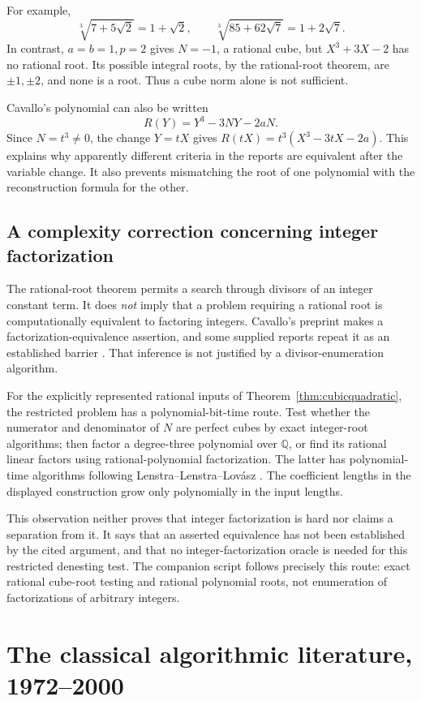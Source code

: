 \documentclass[11pt,letterpaper]{article}
\numberwithin{equation}{section}
\theoremstyle{definition}
\theoremstyle{remark}
\newcommand{\Q}{\mathbb{Q}}
\begin{document}
For example,
\[
\sqrt[3]{7+5\sqrt2}=1+\sqrt2,
\qquad
\sqrt[3]{85+62\sqrt7}=1+2\sqrt7.
\]
In contrast, $a=b=1,p=2$ gives $N=-1$, a rational cube, but $X^3+3X-2$ has no rational root. Its possible integral roots, by the rational-root theorem, are $\pm1,\pm2$, and none is a root. Thus a cube norm alone is not sufficient.

Cavallo's polynomial can also be written
\[
R(Y)=Y^3-3NY-2aN.
\]
Since $N=t^3\ne0$, the change $Y=tX$ gives $R(tX)=t^3(X^3-3tX-2a)$. This explains why apparently different criteria in the reports are equivalent after the variable change. It also prevents mismatching the root of one polynomial with the reconstruction formula for the other.

\subsection{A complexity correction concerning integer factorization}
The rational-root theorem permits a search through divisors of an integer constant term. It does \emph{not} imply that a problem requiring a rational root is computationally equivalent to factoring integers. Cavallo's preprint makes a factorization-equivalence assertion, and some supplied reports repeat it as an established barrier \cite{cavallo}. That inference is not justified by a divisor-enumeration algorithm.

For the explicitly represented rational inputs of Theorem~\ref{thm:cubicquadratic}, the restricted problem has a polynomial-bit-time route. Test whether the numerator and denominator of $N$ are perfect cubes by exact integer-root algorithms; then factor a degree-three polynomial over $\Q$, or find its rational linear factors using rational-polynomial factorization. The latter has polynomial-time algorithms following Lenstra--Lenstra--Lov\'asz \cite{lll}. The coefficient lengths in the displayed construction grow only polynomially in the input lengths.

This observation neither proves that integer factorization is hard nor claims a separation from it. It says that an asserted equivalence has not been established by the cited argument, and that no integer-factorization oracle is needed for this restricted denesting test. The companion script follows precisely this route: exact rational cube-root testing and rational polynomial roots, not enumeration of factorizations of arbitrary integers.

\section{The classical algorithmic literature, 1972--2000}\label{sec:classical}
\end{document}
